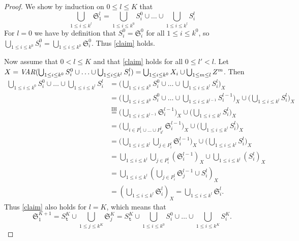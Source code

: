 \lemmato*
\begin{proof}
We show by induction on $0\leq l\leq K$ that 
\begin{equation}\label{claim}
\bigcup_{1\leq i \leq k^l}\mathfrak{S}^{l}_1 = \bigcup_{1\leq i\leq k^0}S^0_i\cup\ldots\cup\bigcup_{1\leq i\leq k^l} S^l_i 
\end{equation}
For $l=0$ we have by definition that $S^0_i=\mathfrak{S}^0_i$ for all $1\leq i\leq k^0$, so $\bigcup_{1\leq i\leq k^0}S^0_i = \bigcup_{1\leq i\leq k^0}\mathfrak{S}^0_i$. Thus \eqref{claim} holds.

Now assume that $0<l\leq K$ and that \eqref{claim} holds for all $0\leq l'<l$. 
Let $X = \mathit{VAR}(\bigcup_{1\leq i\leq k^0}S^0_i\cup\ldots\cup\bigcup_{1\leq i\leq k^l} S^l_i)=\bigcup_{1\leq i\leq k^0}X_i \cup \bigcup_{1\leq m \leq l}Z^m$.
Then
\begin{align*}
\bigcup_{1\leq i\leq k^0}S^0_i\cup\ldots\cup\bigcup_{1\leq i\leq k^l} S^l_i
&=\big(\bigcup_{1\leq i\leq k^0}S^0_i\cup\ldots\cup\bigcup_{1\leq i\leq k^l} S^l_i\big)_X\\
&= \big(\bigcup_{1\leq i\leq k^0}S^0_i\cup\ldots\cup\bigcup_{1\leq i\leq k^{l-1}}S^{l-1}_i\big)_X\cup\big(\bigcup_{1\leq i\leq k^l} S^l_i\big)_X\\
&\overset{\text{IH}}=\big(\bigcup_{1\leq i\leq k^{l-1}}\mathfrak{S}^{l-1}_i\big)_X\cup\big(\bigcup_{1\leq i\leq k^l} S^l_i\big)_X\\
&=\big(\bigcup_{i\in P^l_1\cup\ldots \cup P^l_{k^l}}\mathfrak{S}^{l-1}_i\big)_X\cup\big(\bigcup_{1\leq i\leq k^l}S^l_i\big)_X\\
&=\big(\bigcup_{1\leq i\leq k^l}\bigcup_{j\in P^l_i}\mathfrak{S}^{l-1}_i\big)_X\cup\big(\bigcup_{1\leq i\leq k^l}S^l_i\big)_X\\
&=\bigcup_{1\leq i\leq k^l}\bigcup_{j\in P^l_i}(\mathfrak{S}^{l-1}_i)_X\cup\bigcup_{1\leq i\leq k^l}(S^l_i)_X\\
&= \bigcup_{1\leq i\leq k^l}(\bigcup_{j\in P^l_i}\mathfrak{S}^{l-1}_j\cup S^l_i)_X\\
&= (\bigcup_{1\leq i\leq k^l}\mathfrak{S}^l_i)_X = \bigcup_{1\leq i\leq k^l}\mathfrak{S}^l_i.
\end{align*}
Thus \eqref{claim} also holds for $l=K$, which means that 
\[
\mathfrak{S}^{K+1}_1 = S^{K}_\texttt{t} \cup\bigcup_{1\leq j\leq k^K}\mathfrak{S}^K_j =
S^K_\texttt{t}\cup\bigcup_{1\leq i\leq k^0}S^0_i\cup\ldots\cup\bigcup_{1\leq i\leq k^K} S^K_i.
\]
\end{proof}

